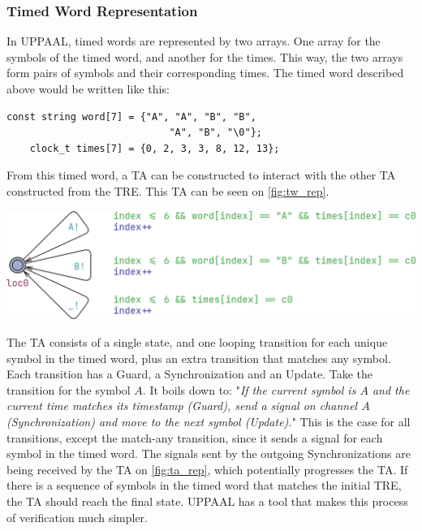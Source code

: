 \subsubsection{Timed Word Representation}\label{subsubsec:tw_rep}
In UPPAAL, timed words are represented by two arrays. One array for the symbols of the timed word, and another for the times. This way, the two arrays form pairs of symbols and their corresponding times. The timed word described above would be written like this:

\begin{lstlisting}[basicstyle=\scriptsize]
    const string word[7] = {"A", "A", "B", "B", 
                            "A", "B", "\0"};
    clock_t times[7] = {0, 2, 3, 3, 8, 12, 13};
\end{lstlisting}
\label{lstlisting:timed_word}

From this timed word, a TA can be constructed to interact with the other TA constructed from the TRE. This TA can be seen on \cref{fig:tw_rep}.

\begin{center}
    \includegraphics[width=\columnwidth]{Documents/Diagrams/CheckingFigures/checking_twrep.png}
    \label{fig:tw_rep}
\end{center}

The TA consists of a single state, and one looping transition for each unique symbol in the timed word, plus an extra transition that matches any symbol.
Each transition has a Guard, a Synchronization and an Update. Take the transition for the symbol $A$.
It boils down to: "\textit{If the current symbol is $A$ and the current time matches its timestamp (Guard), send a signal on channel $A$(Synchronization) and move to the next symbol (Update).}"
This is the case for all transitions, except the match-any transition, since it sends a signal for each symbol in the timed word. The signals sent by the outgoing Synchronizations are being received by the TA on \cref{fig:ta_rep}, which potentially progresses the TA. If there is a sequence of symbols in the timed word that matches the initial TRE, the TA should reach the final state. UPPAAL has a tool that makes this process of verification much simpler.

